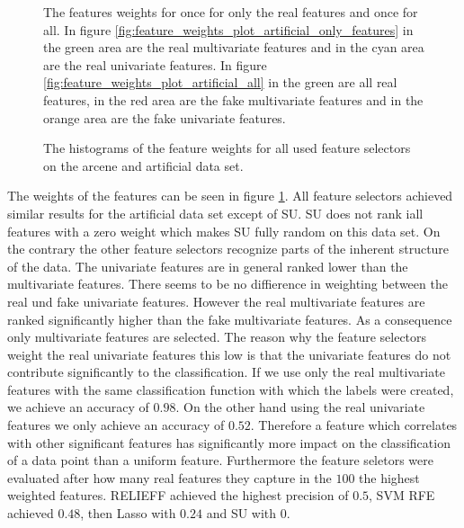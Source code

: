 \documentclass[twoside,11pt]{article}
\begin{document}
\begin{figure}
  \caption{The features weights for once for only the real features and once for all. In figure \ref{fig:feature_weights_plot_artificial_only_features} in the green area are the real multivariate features and in the cyan area are the real univariate features. In figure \ref{fig:feature_weights_plot_artificial_all} in the green are all real features, in the red area are the fake multivariate features and in the orange area are the fake univariate features. }
  \label{fig:feature_weights_plot_artificial}
\end{figure}
\begin{figure}[h!]
  \centering
  \caption{The histograms of the feature weights for all used feature selectors on the arcene and artificial data set.}
\end{figure}
The weights of the features can be seen in figure \ref{fig:feature_weights_plot_artificial}.
All feature selectors achieved similar results for the artificial data set except of SU. SU does not rank iall features with a zero weight which makes SU fully random on this data set. On the contrary the other feature selectors recognize parts of the inherent structure of the data. The univariate features are in general ranked lower than the multivariate features. There seems to be no diffierence in weighting between the real und fake univariate features. However the real multivariate features are ranked significantly higher than the fake multivariate features. As a consequence only multivariate features are selected. The reason why the feature selectors weight the real univariate features this low is that the univariate features do not contribute significantly to the classification. If we use only the real multivariate features with the same classification function with which the labels were created, we achieve an accuracy of $0.98$. On the other hand using the real univariate features we only achieve an accuracy of $0.52$. Therefore a feature which correlates with other significant features has significantly more impact on the classification of a data point than a uniform feature.
Furthermore the feature seletors were evaluated after how many real features they capture in the $100$ the highest weighted features. RELIEFF achieved the highest precision of $0.5$, SVM RFE achieved $0.48$, then Lasso with $0.24$ and SU with $0$.


\end{document}
